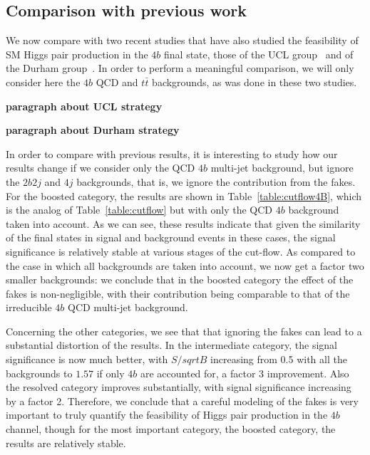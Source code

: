 \subsection{Comparison with previous work}

We now compare with two recent studies that have also studied the
feasibility of SM Higgs pair production in the $4b$ final state,
those of the UCL group~\cite{Wardrope:2014kya} and of the
Durham group~\cite{deLima:2014dta}.
%
In order to perform a meaningful comparison, we will only consider
here the $4b$ QCD and $t\bar{t}$ backgrounds, as was done
in these two studies.

{\bf paragraph about UCL strategy}


{\bf paragraph about Durham strategy}


In order to compare with previous results, it is interesting to
study how our results change if we consider only the QCD $4b$
multi-jet background, but ignore the $2b2j$ and $4j$ backgrounds,
that is, we ignore the contribution from the fakes.
%
For the boosted category, the results are shown in
Table~\ref{table:cutflow4B}, which is the analog of
Table~\ref{table:cutflow} but with only the QCD
$4b$ background taken into account.
%
As we can see, these results indicate that given the similarity of the final states
in signal and background events in these cases, the signal significance is
relatively stable at various stages of the cut-flow.
%
As compared to the case in which all backgrounds are taken into account, we
now get a factor two smaller backgrounds: we conclude that in the boosted category
the effect of the fakes is non-negligible, with their contribution being
comparable to that of the irreducible $4b$ QCD multi-jet background.

Concerning the other categories, we see that that ignoring the fakes can lead to a substantial
distortion of the results.
%
In the intermediate category, the signal significance is now much better, with $S/sqrt{B}$ increasing from
0.5 with all the backgrounds to $1.57$ if only $4b$ are accounted for, a factor 3 improvement.
%
Also the resolved category improves substantially, with signal significance increasing by a factor 2.
%
Therefore, we conclude that a careful modeling of the fakes is very important to truly quantify
the feasibility of Higgs pair production in the $4b$ channel, though for the most
important category, the boosted category, the results are relatively stable.


